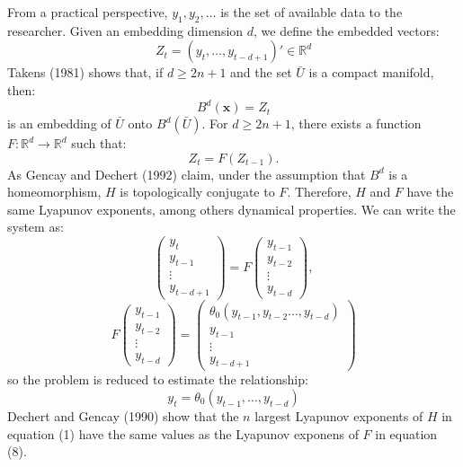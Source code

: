 \documentclass[12pt]{article}
\begin{document}
From a practical perspective, ${y_1, y_2,\ldots}$ is the set of available data to the researcher. Given an embedding dimension $d$, we define the embedded vectors:
\begin{equation}
Z_{t}=(y_{t},\ldots,y_{t-d+1})'\in\mathbb{R}^{d}
\end{equation}
Takens (1981) shows that, if $d\geq 2 n + 1$ and the set $\bar{U}$ is a compact manifold, then:
\begin{equation}
B^{d}(\mathbf{x})=Z_{t}
\end{equation}
is an embedding of $\bar{U}$ onto $B^{d}(\bar{U})$. For $d\geq 2 n + 1$, there exists a function $F: \mathbb{R}^d \rightarrow \mathbb{R}^d$ such that:
\begin{equation}
Z_{t}=F(Z_{t-1}).
\end{equation}
As Gencay and Dechert (1992) claim, under the assumption that $B^d$ is a homeomorphism, $H$ is topologically conjugate to $F$. Therefore, $H$ and $F$ have the same Lyapunov exponents, among others dynamical properties. We can write the system as:
\begin{equation}
\left(\begin{array}{c} 
 y_{t} \\  y_{t-1} \\ \vdots  \\ y_{t-d+1} 
\end{array}\right)  =
F\left(\begin{array}{c} 
 y_{t-1} \\  y_{t-2} \\ \vdots  \\ y_{t-d}
\end{array}\right),
\end{equation}
\begin{equation}
F\left(\begin{array}{c} 
 y_{t-1} \\  y_{t-2} \\ \vdots  \\ y_{t-d}
\end{array}\right)=
\left(\begin{array}{c} 
 \theta_{0}(y_{t-1}, y_{t-2}\ldots,y_{t-d}) \\  y_{t-1} \\ \vdots  \\ y_{t-d+1} 
\end{array}\right)
\end{equation}
so the problem is reduced to estimate the relationship:
\begin{equation}
y_{t}=\theta_{0}(y_{t-1},\ldots,y_{t-d})
\end{equation}
Dechert and Gencay (1990) show that the $n$ largest Lyapunov exponents of $H$ in equation (1) have
the same values as the Lyapunov exponens of $F$ in equation (8).
\end{document}
